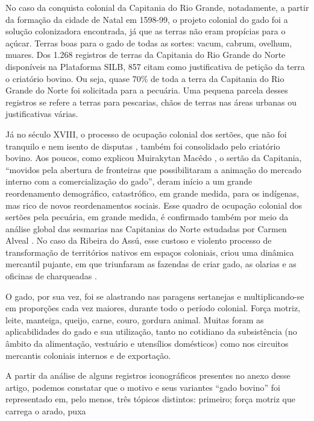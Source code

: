 \begin{refsection}
No caso da conquista colonial da Capitania do Rio Grande, notadamente, a partir da formação da cidade de Natal em 1598-99, o projeto colonial do gado foi a solução colonizadora encontrada, já que as terras não eram propícias para o açúcar. Terras boas para o gado de todas as sortes: vacum, cabrum, ovelhum, muares. Dos 1.268 registros de terras da Capitania do Rio Grande do Norte disponíveis na Plataforma SILB, 857 citam como justificativa de petição da terra o criatório bovino. Ou seja, quase 70\% de toda a terra da Capitania do Rio Grande do Norte foi solicitada para a pecuária. Uma pequena parcela desses registros se refere a terras para pescarias, chãos de terras nas áreas urbanas ou justificativas várias.

Já no século XVIII, o processo de ocupação colonial dos sertões, que não foi tranquilo e nem isento de disputas \cites{Araujo2007}{Alencar2017}, também foi consolidado pelo criatório bovino. Aos poucos, como explicou Muirakytan Macêdo \citeyear{Macedo2007rusticos}, o sertão da Capitania, “movidos pela abertura de fronteiras que possibilitaram a animação do mercado interno com a comercialização do gado”, deram início a um grande reordenamento demográfico, catastrófico, em grande medida, para os indígenas, mas rico de novos reordenamentos sociais. Esse quadro de ocupação colonial dos sertões pela pecuária, em grande medida, é confirmado também por meio da análise global das sesmarias nas Capitanias do Norte estudadas por Carmen Alveal \citeyear{Alveal2019}. No caso da Ribeira do Assú, esse custoso e violento processo de transformação de territórios nativos em espaços coloniais, criou uma dinâmica mercantil pujante, em que triunfaram as fazendas de criar gado, as olarias e as oficinas de charqueadas \cite{Silva2015}.

O gado, por sua vez, foi se alastrando nas paragens sertanejas e multiplicando-se em proporções cada vez maiores, durante todo o período colonial. Força motriz, leite, manteiga, queijo, carne, couro, gordura animal. Muitas foram as aplicabilidades do gado e sua utilização, tanto no cotidiano da subsistência (no âmbito da alimentação, vestuário e utensílios domésticos) como nos circuitos mercantis coloniais internos e de exportação.

A partir da análise de alguns registros iconográficos presentes no anexo desse artigo, podemos constatar que o motivo e seus variantes ``gado bovino'' foi representado em, pelo menos, três tópicos distintos: primeiro; força motriz que carrega o arado, puxa


\end{refsection}
